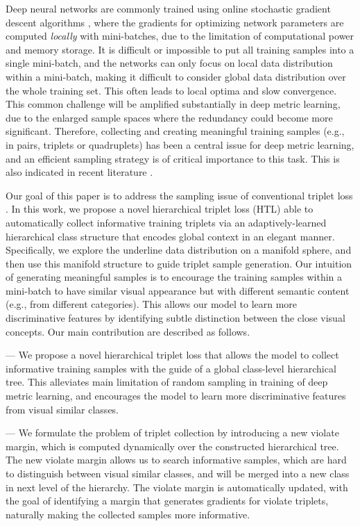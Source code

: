 \documentclass[runningheads]{llncs}
\begin{document}
Deep neural networks are commonly trained using online stochastic gradient descent algorithms \cite{orr2003neural}, where the gradients for optimizing network parameters are computed \emph{locally} with mini-batches, due to the limitation of computational power and memory storage. It is difficult or impossible to put all training samples into a single mini-batch, and  the networks can only focus on local data distribution within a mini-batch, making it difficult to consider global data distribution over the whole training set. This often leads to local optima and slow convergence. This common challenge will be amplified substantially in deep metric learning, due to the enlarged sample spaces where the redundancy could become more significant. Therefore, collecting and creating meaningful training samples (e.g., in pairs, triplets or quadruplets) has been a central issue for deep metric learning, and an efficient sampling strategy is of critical importance to this task. This is also indicated in recent literature \cite{schroff2015facenet,Wu_2017_ICCV,parkhi2015deep,amos2016openface}.

Our goal of this paper is to address the sampling issue of conventional triplet loss \cite{schroff2015facenet}. In this work, we propose a novel hierarchical triplet loss (HTL) able to automatically collect informative training triplets via an adaptively-learned hierarchical class structure that encodes global context in an elegant manner. Specifically, we explore the underline data distribution on a manifold sphere, and then use this manifold structure to guide triplet sample generation. Our intuition of generating meaningful samples is to encourage the training samples within a mini-batch to have similar visual appearance but with different semantic content (e.g., from different categories). This allows our model to learn more discriminative features by identifying subtle distinction between the close visual concepts. Our main contribution are described as follows.





--- We propose a novel hierarchical triplet loss that allows the model to collect informative training samples with the guide of a global class-level hierarchical tree. This alleviates main limitation of random sampling in training of deep metric learning, and encourages the model to learn more discriminative  features from visual similar classes.

--- We formulate the problem of triplet collection by introducing a new violate margin, which is computed dynamically over the constructed hierarchical tree. The new violate margin allows us to search informative samples, which are hard to distinguish between visual similar classes, and will be merged into a new class in next level of the hierarchy. The violate margin is automatically updated, with the goal of identifying a margin that generates gradients for violate triplets, naturally making the collected samples  more informative.
\end{document}
